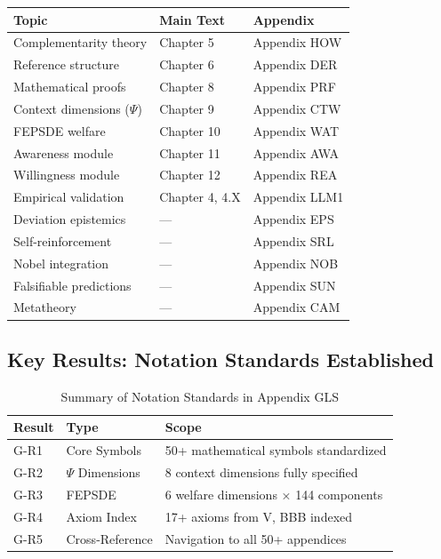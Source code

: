 \begin{center}
\renewcommand{\arraystretch}{1.2}
\begin{tabular}{lll}
\hline
\textbf{Topic} & \textbf{Main Text} & \textbf{Appendix} \\
\hline
Complementarity theory & Chapter 5 & Appendix HOW \\
Reference structure & Chapter 6 & Appendix DER \\
Mathematical proofs & Chapter 8 & Appendix PRF \\
Context dimensions ($\Psi$) & Chapter 9 & Appendix CTW \\
FEPSDE welfare & Chapter 10 & Appendix WAT \\
Awareness module & Chapter 11 & Appendix AWA \\
Willingness module & Chapter 12 & Appendix REA \\
Empirical validation & Chapter 4, 4.X & Appendix LLM1 \\
Deviation epistemics & --- & Appendix EPS \\
Self-reinforcement & --- & Appendix SRL \\
Nobel integration & --- & Appendix NOB \\
Falsifiable predictions & --- & Appendix SUN \\
Metatheory & --- & Appendix CAM \\
\hline
\end{tabular}
\end{center}


\subsection{Key Results: Notation Standards Established}
\label{sec:glossary-results}

\begin{table}[htbp]
\centering
\caption{Summary of Notation Standards in Appendix GLS}
\label{tab:g-results}
\renewcommand{\arraystretch}{1.2}
\begin{tabular}{@{}llp{6cm}@{}}
\toprule
\textbf{Result} & \textbf{Type} & \textbf{Scope} \\
\midrule
G-R1 & Core Symbols & 50+ mathematical symbols standardized \\
G-R2 & $\Psi$ Dimensions & 8 context dimensions fully specified \\
G-R3 & FEPSDE & 6 welfare dimensions × 144 components \\
G-R4 & Axiom Index & 17+ axioms from V, BBB indexed \\
G-R5 & Cross-Reference & Navigation to all 50+ appendices \\
\bottomrule
\end{tabular}
\end{table}

